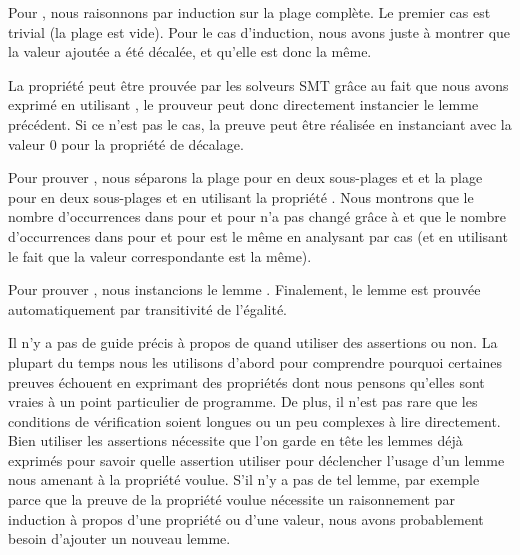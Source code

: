 Pour , nous raisonnons par induction sur la
plage complète. Le premier cas est trivial (la plage est vide). Pour le cas
d'induction, nous avons juste à montrer que la valeur ajoutée a été décalée, et
qu'elle est donc la même.


La propriété  peut être prouvée par les
solveurs SMT grâce au fait que nous avons exprimé  en
utilisant , le prouveur peut donc directement instancier le
lemme précédent. Si ce n'est pas le cas, la preuve peut être réalisée en
instanciant  avec la valeur 0 pour la
propriété de décalage.


Pour prouver , nous séparons la plage
pour  en deux sous-plages  et
 et la plage pour  en deux sous-plages
 et  en utilisant la propriété
. Nous montrons que le nombre d'occurrences
dans  pour  et 
pour  n'a pas changé grâce à 
et que le nombre d'occurrences dans  pour
 et  pour  est le même
en analysant par cas (et en utilisant le fait que la valeur correspondante est
la même).


Pour prouver , nous instancions le lemme
. Finalement, le lemme
 est prouvée automatiquement par transitivité
de l'égalité.




Il n'y a pas de guide précis à propos de quand utiliser des assertions ou non.
La plupart du temps nous les utilisons d'abord pour comprendre pourquoi certaines
preuves échouent en exprimant des propriétés dont nous pensons qu'elles sont vraies
à un point particulier de programme. De plus, il n'est pas rare que les conditions
de vérification soient longues ou un peu complexes à lire directement. Bien
utiliser les assertions nécessite que l'on garde en tête les lemmes déjà exprimés
pour savoir quelle assertion utiliser pour déclencher l'usage d'un lemme nous
amenant à la propriété voulue. S'il n'y a pas de tel lemme, par exemple parce
que la preuve de la propriété voulue nécessite un raisonnement par induction à
propos d'une propriété ou d'une valeur, nous avons probablement besoin d'ajouter
un nouveau lemme.


